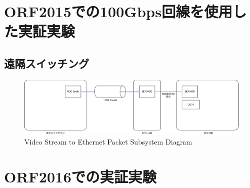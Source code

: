 \chapter{ORF2015での100Gbps回線を使用した実証実験}
\label{chap:orf2015}
\section{遠隔スイッチング}

\begin{figure}[htbp]
    \begin{center}
        \includegraphics[bb=0 0 1101 282,width=15.5cm]{img/orf2015-flow.pdf}
    \end{center}
    \caption{Video Stream to Ethernet Packet Subsystem Diagram}
    \label{fig:orf2015-flow}
\end{figure}

\chapter{ORF2016での実証実験}
\label{chap:orf2016}
